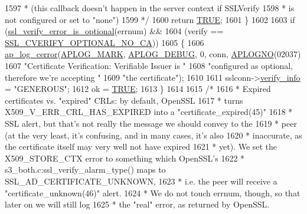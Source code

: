 \begin{DoxyCode}
{{1597 \textcolor{comment}{         * (this callback doesn't happen in the server context if SSLVerify}
1598 \textcolor{comment}{         *  is not configured or set to "none")}
1599 \textcolor{comment}{         */}
1600         \textcolor{keywordflow}{return} \hyperlink{group__MOD__SSL__PRIVATE_gaa8cecfc5c5c054d2875c03e77b7be15d}{TRUE};
1601     \}
1602 
1603     \textcolor{keywordflow}{if} (\hyperlink{group__MOD__SSL__PRIVATE_ga479773343fd970be23c26b9a354e0c51}{ssl\_verify\_error\_is\_optional}(errnum) &&
1604         (verify == \hyperlink{group__MOD__SSL__PRIVATE_gga5473d623bb868c0030b9d21ff13b04f5a3acf7342e979f10ccde706fe752b3f18}{SSL\_CVERIFY\_OPTIONAL\_NO\_CA}))
1605     \{
1606         \hyperlink{group__APACHE__CORE__LOG_ga60ef6919b8e1b691b0c1ac4d67c9449f}{ap\_log\_cerror}(\hyperlink{group__APACHE__CORE__LOG_ga655e126996849bcb82e4e5a14c616f4a}{APLOG\_MARK}, \hyperlink{group__APACHE__CORE__LOG_gadfcef90537539cf2b7d35cfbbbafeb93}{APLOG\_DEBUG}, 0, conn, 
      \hyperlink{group__APACHE__CORE__LOG_ga1dee8a07e06bc5b3de8b89662c2cd666}{APLOGNO}(02037)
1607                       \textcolor{stringliteral}{"Certificate Verification: Verifiable Issuer is "}
1608                       \textcolor{stringliteral}{"configured as optional, therefore we're accepting "}
1609                       \textcolor{stringliteral}{"the certificate"});
1610 
1611         sslconn->\hyperlink{structSSLConnRec_a222765269058c8c8fa00113cdaf88b22}{verify\_info} = \textcolor{stringliteral}{"GENEROUS"};
1612         ok = \hyperlink{group__MOD__SSL__PRIVATE_gaa8cecfc5c5c054d2875c03e77b7be15d}{TRUE};
1613     \}
1614 
1615     \textcolor{comment}{/*}
1616 \textcolor{comment}{     * Expired certificates vs. "expired" CRLs: by default, OpenSSL}
1617 \textcolor{comment}{     * turns X509\_V\_ERR\_CRL\_HAS\_EXPIRED into a "certificate\_expired(45)"}
1618 \textcolor{comment}{     * SSL alert, but that's not really the message we should convey to the}
1619 \textcolor{comment}{     * peer (at the very least, it's confusing, and in many cases, it's also}
1620 \textcolor{comment}{     * inaccurate, as the certificate itself may very well not have expired}
1621 \textcolor{comment}{     * yet). We set the X509\_STORE\_CTX error to something which OpenSSL's}
1622 \textcolor{comment}{     * s3\_both.c:ssl\_verify\_alarm\_type() maps to SSL\_AD\_CERTIFICATE\_UNKNOWN,}
1623 \textcolor{comment}{     * i.e. the peer will receive a "certificate\_unknown(46)" alert.}
1624 \textcolor{comment}{     * We do not touch errnum, though, so that later on we will still log}
1625 \textcolor{comment}{     * the "real" error, as returned by OpenSSL.}
}}
\end{DoxyCode}
